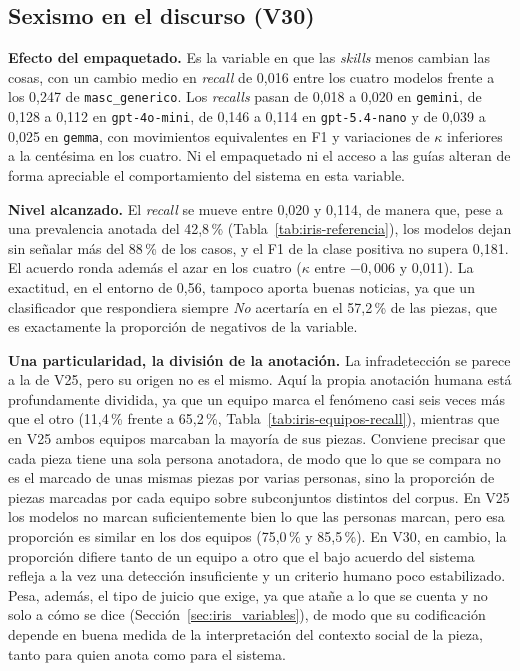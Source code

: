 \subsection{Sexismo en el discurso (V30)}



\textbf{Efecto del empaquetado.} Es la variable en que las \textit{skills} menos
cambian las cosas, con un cambio medio en \textit{recall} de 0,016 entre los cuatro modelos
frente a los 0,247 de \texttt{masc\_generico}. Los \textit{recalls} pasan de 0,018 a 0,020 en
\texttt{gemini}, de 0,128 a 0,112 en \texttt{gpt-4o-mini}, de 0,146 a 0,114 en
\texttt{gpt-5.4-nano} y de 0,039 a 0,025 en \texttt{gemma}, con movimientos
equivalentes en F1 y variaciones de $\kappa$ inferiores a la centésima en los cuatro. Ni el
empaquetado ni el acceso a las guías alteran de forma apreciable el comportamiento del
sistema en esta variable.

\textbf{Nivel alcanzado.} El \textit{recall} se mueve entre 0,020 y 0,114, de manera que, pese a
una prevalencia anotada del 42,8\,\% (Tabla~\ref{tab:iris-referencia}), los modelos dejan sin señalar más del 88\,\% de
los casos, y el F1 de la clase positiva no supera 0,181. El acuerdo ronda además el
azar en los cuatro ($\kappa$ entre $-0,006$ y 0,011). La exactitud, en el entorno de
0,56, tampoco aporta buenas noticias, ya que un clasificador que respondiera siempre
\textit{No} acertaría en el 57,2\,\% de las piezas, que es exactamente la proporción
de negativos de la variable.

\textbf{Una particularidad, la división de la anotación.} La infradetección se parece a
la de V25, pero su origen no es el mismo. Aquí la propia anotación humana está
profundamente dividida, ya que un equipo marca el fenómeno casi seis veces más que el
otro (11,4\,\% frente a 65,2\,\%, Tabla~\ref{tab:iris-equipos-recall}), mientras que en
V25 ambos equipos marcaban la mayoría de sus piezas. Conviene precisar que cada pieza
tiene una sola persona anotadora, de modo que lo que se compara no es el marcado de unas
mismas piezas por varias personas, sino la proporción de piezas marcadas por cada
equipo sobre subconjuntos distintos del corpus. En V25 los modelos no marcan
suficientemente bien lo que las personas marcan, pero esa proporción es similar en
los dos equipos (75,0\,\% y 85,5\,\%). En V30, en cambio, la proporción difiere tanto
de un equipo a otro que el bajo acuerdo del sistema refleja a la vez una detección
insuficiente y un criterio humano poco estabilizado. Pesa, además, el tipo de
juicio que exige, ya que atañe a lo que se cuenta y no solo a cómo se dice
(Sección~\ref{sec:iris_variables}), de modo que su codificación depende en buena medida
de la interpretación del contexto social de la pieza, tanto para quien anota como para
el sistema.

